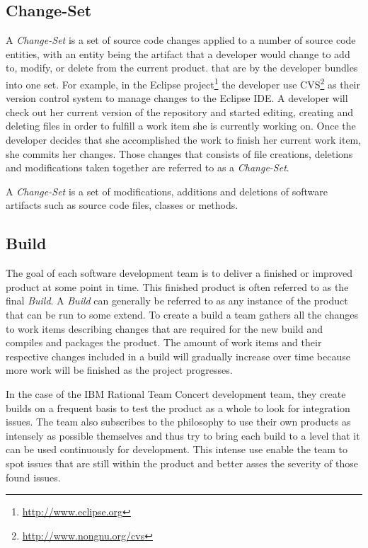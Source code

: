 \subsection{Change-Set}
A \emph{Change-Set} is a set of source code changes applied to a number of source code entities, with an entity being the artifact that a developer would change to add to, modify, or delete from the current product. that are by the developer bundles into one set.
For example, in the Eclipse project\footnote{\url{http://www.eclipse.org}} the developer use CVS\footnote{\url{http://www.nongnu.org/cvs}} as their version control system to manage changes to the Eclipse IDE.
A developer will check out her current version of the repository and started editing, creating and deleting files in order to fulfill a work item she is currently working on.
Once the developer decides that she accomplished the work to finish her current work item, she commits her changes.
Those changes that consists of file creations, deletions and modifications taken together are referred to as a \emph{Change-Set}. 

\begin{note}
\begin{mydef}
A \emph{Change-Set} is a set of modifications, additions and deletions of software artifacts such as source code files, classes or methods.
\end{mydef}
\end{note}

\subsection{Build}
The goal of each software development team is to deliver a finished or improved product at some point in time.
This finished product is often referred to as the final \emph{Build}.
A \emph{Build} can generally be referred to as any instance of the product that can be run to some extend.
To create a build a team gathers all the changes to work items describing changes that are required for the new build and compiles and packages the product.
The amount of work items and their respective changes included in a build will gradually increase over time because more work will be finished as the project progresses.

In the case of the IBM Rational Team Concert development team, they create builds on a frequent basis to test the product as a whole to look for integration issues. 
The team also subscribes to the philosophy to use their own products as intensely as possible themselves and thus try to bring each build to a level that it can be used continuously for development.
This intense use enable the team to spot issues that are still within the product and better asses the severity of those found issues.

